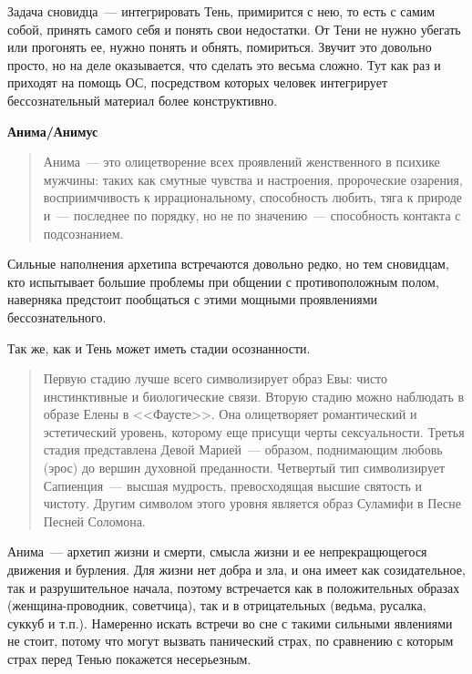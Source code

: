 \documentclass[a5paper,12pt,twoside]{memoir}
\begin{document}
Задача сновидца~--- интегрировать Тень, примирится с нею, то есть с самим собой, принять самого себя и понять свои недостатки. От Тени не нужно убегать или прогонять ее, нужно понять и обнять, помириться. Звучит это довольно просто, но на деле оказывается, что сделать это весьма сложно. Тут как раз и приходят на помощь ОС, посредством которых человек интегрирует бессознательный материал более конструктивно.

\begin{center}
\bfseries{Анима/Анимус}
\end{center} 


\begin{quotation}
Анима~--- это олицетворение всех проявлений женственного в психике мужчины: таких как смутные чувства и настроения, пророческие озарения, восприимчивость к иррациональному, способность любить, тяга к природе и~--- последнее по порядку, но не по значению~--- способность контакта с подсознанием. 
\end{quotation}

Сильные наполнения архетипа встречаются довольно редко, но тем сновидцам, кто испытывает большие проблемы при общении с противоположным полом, наверняка предстоит пообщаться с этими мощными проявлениями бессознательного.

Так же, как и Тень может иметь стадии осознанности.

\begin{quotation}
Первую стадию лучше всего символизирует образ Евы: чисто инстинктивные и биологические связи. Вторую стадию можно наблюдать в образе Елены в <<Фаусте>>. Она олицетворяет романтический и эстетический уровень, которому еще присущи черты сексуальности. Третья стадия представлена Девой Марией~--- образом, поднимающим любовь (эрос) до вершин духовной преданности. Четвертый тип символизирует Сапиенция~--- высшая мудрость, превосходящая высшие святость и чистоту. Другим символом этого уровня является образ Суламифи в Песне Песней Соломона. 
\end{quotation}

Анима~--- архетип жизни и смерти, смысла жизни и ее непрекращющегося движения и бурления. Для жизни нет добра и зла, и она имеет как созидательное, так и разрушительное начала, поэтому встречается как в положительных образах (женщина-проводник, советчица), так и в отрицательных (ведьма, русалка, суккуб и т.п.). Намеренно искать встречи во сне с такими сильными явлениями не стоит, потому что могут вызвать панический страх, по сравнению с которым страх перед Тенью покажется несерьезным.
\end{document}
